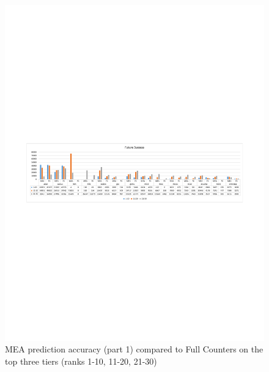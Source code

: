 \begin{figure}[t]
  \includegraphics[width=\textwidth]{figures/mea_2.pdf}
  \caption{MEA prediction accuracy (part 1) compared to Full Counters on the top three tiers (ranks 1-10, 11-20, 21-30)}
  \label{fig:mea_2}
\end{figure}

